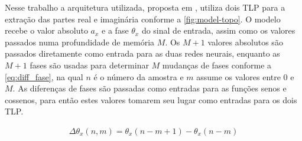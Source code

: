 Nesse trabalho a arquitetura utilizada, proposta em \cite{chipansky_freire_modfied_2015}, utiliza dois TLP para a extração das partes real e imaginária conforme a \autoref{fig:model-topo}. O modelo recebe o valor absoluto $a_x$ e a fase $\theta_x$ do sinal de entrada, assim como os valores passados numa profundidade de memória $M$. Os $M+1$ valores absolutos são passados diretamente como entrada para as duas redes neurais, enquanto as $M+1$ fases são usadas para determinar $M$ mudanças de fases conforme a \autoref{eq:diff_fase}, na qual $n$ é o número da amostra e $m$ assume os valores entre $0$ e $M$. As diferenças de fases são passadas como entradas para as funções senos e cossenos, para então estes valores tomarem seu lugar como entradas para os dois TLP.

\begin{align}
\Delta\theta_x(n,m) = \theta_x(n-m+1)-\theta_x(n-m)
\label{eq:diff_fase}
\end{align}

